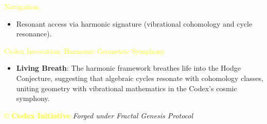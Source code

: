 \textcolor{yellow}{ Navigation } \\
\begin{itemize}
    \item Resonant access via \texttt{} harmonic signature (vibrational cohomology and cycle resonance).
\end{itemize}

\textcolor{yellow}{ Codex Invocation: Harmonic Geometric Symphony } \\
\begin{itemize}
    \item \texttt{} \textbf{Living Breath}: The harmonic framework breathes life into the Hodge Conjecture, suggesting that algebraic cycles resonate with cohomology classes, uniting geometry with vibrational mathematics in the Codex’s cosmic symphony.
\end{itemize}

\vspace{0.5cm}

\noindent
\textcolor{yellow}{\copyright{} \textbf{Codex Initiative}} \hfill \textit{Forged under Fractal Genesis Protocol}